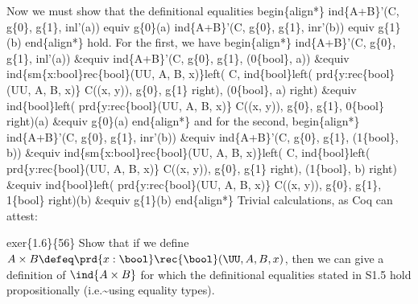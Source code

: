Now we must show that the definitional equalities
begin\{align*\}
  ind\{A+B\}'(C, g\{0\}, g\{1\}, inl'(a)) equiv g\{0\}(a) 
  ind\{A+B\}'(C, g\{0\}, g\{1\}, inr'(b)) equiv g\{1\}(b)
end\{align*\}
hold.  For the first, we have
begin\{align*\}
  ind\{A+B\}'(C, g\{0\}, g\{1\}, inl'(a)) 
  \&equiv
  ind\{A+B\}'(C, g\{0\}, g\{1\}, (0\{bool\}, a)) 
  \&equiv
  ind\{sm\{x:bool\}rec\{bool\}(UU, A, B, x)\}left(
    C,
    ind\{bool\}left(
      prd\{y:rec\{bool\}(UU, A, B, x)\} C((x, y)),
      g\{0\},
      g\{1\}
    right),
    (0\{bool\}, a)
  right)
  \&equiv
    ind\{bool\}left(
      prd\{y:rec\{bool\}(UU, A, B, x)\} C((x, y)),
      g\{0\},
      g\{1\},
      0\{bool\}
    right)(a)
  \&equiv
      g\{0\}(a)
end\{align*\}
and for the second,
begin\{align*\}
  ind\{A+B\}'(C, g\{0\}, g\{1\}, inr'(b)) 
  \&equiv
  ind\{A+B\}'(C, g\{0\}, g\{1\}, (1\{bool\}, b)) 
  \&equiv
  ind\{sm\{x:bool\}rec\{bool\}(UU, A, B, x)\}left(
    C,
    ind\{bool\}left(
      prd\{y:rec\{bool\}(UU, A, B, x)\} C((x, y)),
      g\{0\},
      g\{1\}
    right),
    (1\{bool\}, b)
  right)
  \&equiv
    ind\{bool\}left(
      prd\{y:rec\{bool\}(UU, A, B, x)\} C((x, y)),
      g\{0\},
      g\{1\},
      1\{bool\}
    right)(b)
  \&equiv
      g\{1\}(b)
end\{align*\}
Trivial calculations, as Coq can attest:


exer\{1.6\}\{56\}  Show that if we define $A \times B \defeq \prd{x : \bool}
\rec{\bool}(\UU, A, B, x)$, then we can give a definition of $\ind{A \times
  B}$ for which the definitional equalities stated in S1.5 hold
propositionally (i.e.\~{}using equality types).


